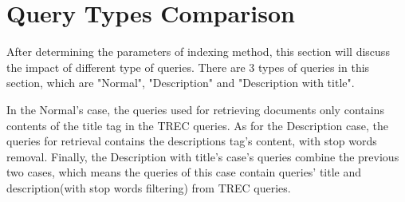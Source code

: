 \documentclass[10pt, a4paper]{article}
\begin{document}
\section{Query Types Comparison}
\label{section:3}
After determining the parameters of indexing method, this section will discuss the impact of different type of queries. There are 3 types of queries in this section, which are "Normal", "Description" and "Description with title".

In the Normal's case, the queries used for retrieving documents only contains contents of the title tag in the TREC queries. As for the Description case, the queries for retrieval contains the descriptions tag's content, with stop words removal. Finally, the Description with title's case's queries combine the previous two cases, which means the queries of this case contain queries' title and description(with stop words filtering) from TREC queries.
\end{document}
